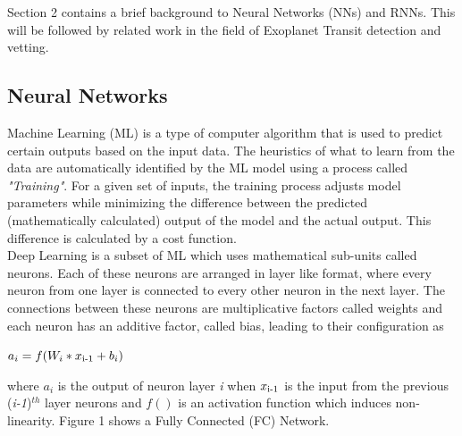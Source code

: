 



Section 2 contains a brief background to Neural Networks (NNs) and RNNs. This will be followed by related work in the field of Exoplanet Transit detection and vetting. 
\subsection{Neural Networks}
Machine Learning (ML) is a type of computer algorithm that is used to predict certain outputs based on the input data. The heuristics of what to learn from the data are automatically identified by the ML model using a process called \emph{"Training"}. For a given set of inputs, the training process adjusts model parameters while minimizing the difference between the predicted (mathematically calculated) output of the model and the actual output. This difference is calculated by a cost function.\\

Deep Learning is a subset of ML which uses mathematical sub-units called neurons. Each of these neurons are arranged in layer like format, where every neuron from one layer is connected to every other neuron in the next layer. The connections between these neurons are multiplicative factors called weights and each neuron has an additive factor, called bias, leading to their configuration as
\begin{center}
$a_i = f(W_i * x\textsubscript{i-1} + b_i)$
\end{center}

where $a_i$ is the output of neuron layer \emph{i} when $x\textsubscript{i-1}$ is the input from the previous (\emph{i-1})$^{th}$ layer neurons and $f()$ is an activation function which induces non-linearity. Figure 1 shows a Fully Connected (FC) Network.

